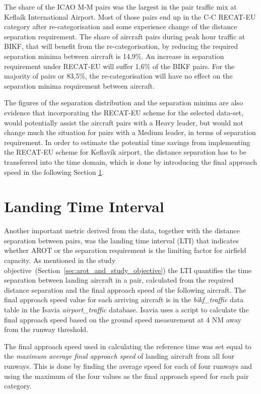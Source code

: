 The share of the ICAO M-M pairs was the largest in the pair traffic mix at Keflaík International Airport. Most of those pairs end up in the C-C RECAT-EU category after re-categorisation and some experience change of the distance separation requirement. The share of aircraft pairs during peak hour traffic at BIKF, that will benefit from the re-categorisation, by reducing the required separation minima between aircraft is 14,9\%. An increase in separation requirement under RECAT-EU will suffer 1,6\% of the BIKF pairs. For the majority of pairs or 83,5\%, the re-categorisation will have no effect on the separation minima requirement between aircraft. 

The figures of the separation distribution and the separation minima are also evidence that incorporating the RECAT-EU scheme for the selected data-set, would potentially assist the aircraft pairs with a Heavy leader, but would not change much the situation for pairs with a Medium leader, in terms of separation requirement. In order to estimate the potential time savings from implementing the RECAT-EU scheme for Keflavík airport, the distance separation has to be transferred into the time domain, which is done by introducing the final approach speed in the following Section \ref{sec:LTI}.

\section{Landing Time Interval}\label{sec:LTI}

Another important metric derived from the data, together with the distance separation between pairs, was the landing time interval (LTI) that indicates whether AROT or the separation requirement is the limiting factor for airfield capacity. As mentioned in the study objective~(Section~\ref{sec:arot_and_study_objective}) the LTI quantifies the time separation between landing aircraft in a pair, calculated from the required distance separation and the final approach speed of the following aircraft. The final approach speed value for each arriving aircraft is in the \textit{bikf\_traffic} data table in the Isavia \textit{airport\_traffic} database. Isavia uses a script to calculate the final approach speed based on the ground speed measurement at 4 NM away from the runway threshold. 

The final approach speed used in calculating the reference time was set equal to the \textit{maximum average final approach speed} of landing aircraft from all four runways. This is done by finding the average speed for each of four runways and using the maximum of the four values as the final approach speed for each pair category. 

